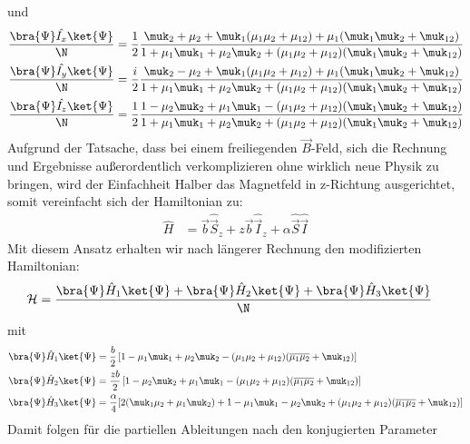 und
\begin{align}
    \frac{\bra{\Psi}\hat{I_x}\ket{\Psi}}{\N} &= \frac{1}{2}\frac{\muk_2 + \mu_2 + \muk_1(\mu_1\mu_2 + \mu_{12}) + \mu_1(\muk_1\muk_2 + \muk_{12})}{1+\mu_1\muk_1 + \mu_2\muk_2 + (\mu_1\mu_2 + \mu_{12})(\muk_1\muk_2 + \muk_{12})} \\
    \frac{\bra{\Psi}\hat{I_y}\ket{\Psi}}{\N} &= \frac{i}{2}\frac{\muk_2 - \mu_2 + \muk_1(\mu_1\mu_2 + \mu_{12}) + \mu_1(\muk_1\muk_2 + \muk_{12})}{1+\mu_1\muk_1 + \mu_2\muk_2 + (\mu_1\mu_2 + \mu_{12})(\muk_1\muk_2 + \muk_{12})}\\
    \frac{\bra{\Psi}\hat{I_z}\ket{\Psi}}{\N} &= \frac{1}{2}\frac{1 - \mu_2\muk_2 + \mu_1\muk_1 - (\mu_1\mu_2 + \mu_{12})(\muk_1\muk_2 + \muk_{12})}{1 + \mu_1\muk_1 + \mu_2\muk_2 + (\mu_1\mu_2 + \mu_{12})(\muk_1\muk_2 + \muk_{12})}  
\end{align}
Aufgrund der Tatsache, dass bei einem freiliegenden $\vec{B}$-Feld, sich die Rechnung und Ergebnisse außerordentlich verkomplizieren ohne 
wirklich neue Physik zu bringen, wird der Einfachheit Halber das Magnetfeld in z-Richtung ausgerichtet, somit vereinfacht sich der 
Hamiltonian zu:
\begin{align}
    \hat{H} &= \vec{b}\hat{\vec{S}}_z +  z\vec{b}\hat{\vec{I}}_z + \alpha \hat{\vec{S}}\hat{\vec{I}}
\end{align}
Mit diesem Ansatz erhalten wir nach längerer Rechnung den modifizierten Hamiltonian:
\begin{align}
    \mathcal{H} &= \frac{\bra{\Psi}\hat{H}_1\ket{\Psi} +\bra{\Psi}\hat{H}_2\ket{\Psi} + \bra{\Psi}\hat{H}_3\ket{\Psi}}{\N}
\end{align}
mit 
\begin{align}
    \bra{\Psi}\hat{H}_1\ket{\Psi} &=  \frac{b}{2}\left[ 1- \mu_1\muk_1 + \mu_2\muk_2 - (\mu_1 \mu_2 + \mu_{12})(\overline{\mu_1\mu_2} + \muk_{12})\right]\\
    \bra{\Psi}\hat{H}_2\ket{\Psi} &=  \frac{z b}{2}\left[ 1- \mu_2\muk_2 + \mu_1\muk_1 - (\mu_1 \mu_2 + \mu_{12})(\overline{\mu_1\mu_2} + \muk_{12})\right] \\
    \bra{\Psi}\hat{H}_3\ket{\Psi} &= \frac{\alpha}{4}[2(\muk_1\mu_2 + \mu_1\muk_2) + 1 - \mu_1\muk_1 - \mu_2\muk_2 + (\mu_1 \mu_2 + \mu_{12})(\overline{\mu_1\mu_2} + \muk_{12})]
\end{align}
\noindent Damit folgen für die partiellen Ableitungen nach den konjugierten Parameter
